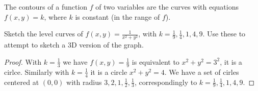 \begin{definition} The contours of a function $f$ of two variables are the curves with equations $f(x,y) = k$, where $k$ is constant (in the range of $f$).
\end{definition}

\begin{example} Sketch the level curves of $f(x,y) = \frac{1}{x^2+y^2}$, with $k=\frac{1}{9}, \frac{1}{4}, 1, 4, 9$. Use these to attempt to sketch a 3D version of the graph.
\end{example}
\begin{proof} With $k=\frac{1}{3}$ we have $f(x,y) = \frac{1}{9}$ is equivalent to $x^2+y^2 = 3^2$, it is a cirlce. Similarly with $k=\frac{1}{4}$ it is a circle $x^2+y^2=4$. We have a set of cirles centered at $(0,0)$ with radius $3,2,1,\frac{1}{2}, \frac{1}{3}$, correspondingly to $k=\frac{1}{9}, \frac{1}{4}, 1, 4, 9$.
\clearpage


\end{proof}
